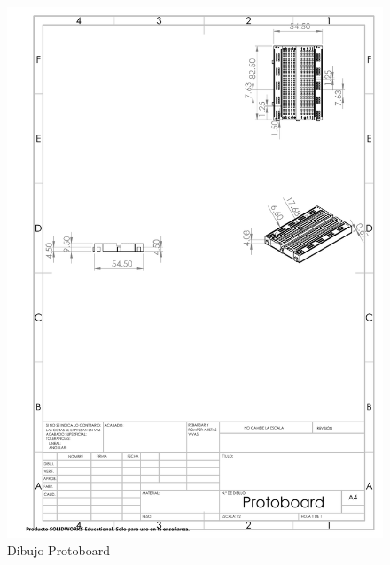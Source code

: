 \begin{figure}[H]
    \centering
    \includegraphics[scale=0.4]{10/Img/cotasProtoboard.pdf}
    \caption{Dibujo Protoboard}
    \label{fig:cotasProtoboard.png}
\end{figure}


